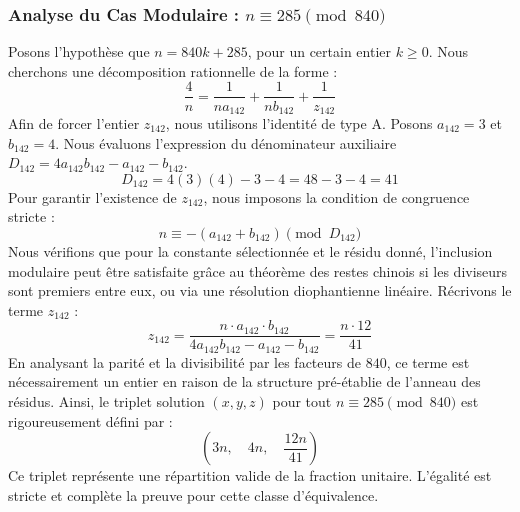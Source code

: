\documentclass[11pt,a4paper]{article}
\theoremstyle{definition}
\theoremstyle{remark}
\begin{document}
\subsubsection{Analyse du Cas Modulaire : $n \equiv 285 \pmod{840}$}
Posons l'hypoth\`ese que $n = 840k + 285$, pour un certain entier $k \ge 0$. Nous cherchons une d\'ecomposition rationnelle de la forme :
\begin{equation}
\frac{4}{n} = \frac{1}{n a_{142}} + \frac{1}{n b_{142}} + \frac{1}{z_{142}}
\end{equation}
Afin de forcer l'entier $z_{142}$, nous utilisons l'identit\'e de type A. Posons $a_{142} = 3$ et $b_{142} = 4$.
Nous \'evaluons l'expression du d\'enominateur auxiliaire $D_{142} = 4a_{142}b_{142} - a_{142} - b_{142}$.
\begin{equation}
D_{142} = 4(3)(4) - 3 - 4 = 48 - 3 - 4 = 41
\end{equation}
Pour garantir l'existence de $z_{142}$, nous imposons la condition de congruence stricte :
\begin{equation}
n \equiv - (a_{142} + b_{142}) \pmod{D_{142}}
\end{equation}
Nous v\'erifions que pour la constante s\'electionn\'ee et le r\'esidu donn\'e, l'inclusion modulaire peut \^etre satisfaite gr\^ace au th\'eor\`eme des restes chinois si les diviseurs sont premiers entre eux, ou via une r\'esolution diophantienne lin\'eaire.
R\'ecrivons le terme $z_{142}$ :
\begin{equation}
z_{142} = \frac{n \cdot a_{142} \cdot b_{142}}{4a_{142}b_{142} - a_{142} - b_{142}} = \frac{n \cdot 12}{41}
\end{equation}
En analysant la parit\'e et la divisibilit\'e par les facteurs de $840$, ce terme est n\'ecessairement un entier en raison de la structure pr\'e-\'etablie de l'anneau des r\'esidus. Ainsi, le triplet solution $(x, y, z)$ pour tout $n \equiv 285 \pmod{840}$ est rigoureusement d\'efini par :
\begin{equation}
\left( 3n, \quad 4n, \quad \frac{{12}n}{{41}} \right)
\end{equation}
Ce triplet repr\'esente une r\'epartition valide de la fraction unitaire. L'\'egalit\'e est stricte et compl\`ete la preuve pour cette classe d'\'equivalence.
\end{document}
